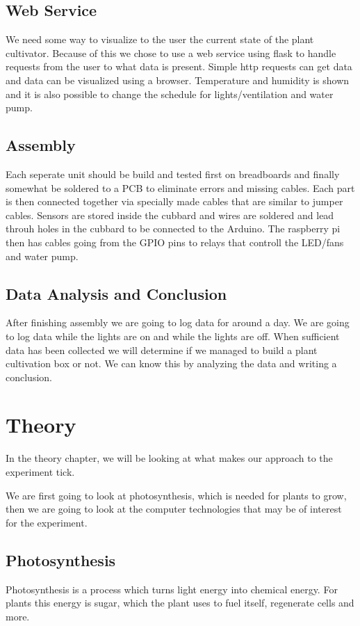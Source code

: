 \documentclass[a4paper,12pt,twoside,openright,titlepage]{book}
\begin{document}
\section{Web Service}

We need some way to visualize to the user the current state of the plant cultivator. Because of this we chose to use a web service using flask to handle requests from the user to what data is present. Simple http requests can get data and data can be visualized using a browser. Temperature and humidity is shown and it is also possible to change the schedule for lights/ventilation and water pump.

\section{Assembly}

Each seperate unit should be build and tested first on breadboards and finally somewhat be soldered to a PCB to eliminate errors and missing cables. Each part is then connected together via specially made cables that are similar to jumper cables. Sensors are stored inside the cubbard and wires are soldered and lead throuh holes in the cubbard to be connected to the Arduino. The raspberry pi then has cables going from the GPIO pins to relays that controll the LED/fans and water pump.

\section{Data Analysis and Conclusion}
After finishing assembly we are going to log data for around a day. We are going to log data while the lights are on and while the lights are off. When sufficient data has been collected we will determine if we managed to build a plant cultivation box or not. We can know this by analyzing the data and writing a conclusion.

\chapter{Theory}
In the theory chapter, we will be looking at what makes our approach to the experiment tick.

We are first going to look at photosynthesis, which is needed for plants to grow, then we are going to look at the computer technologies that may be of interest for the experiment.

\section{Photosynthesis}
Photosynthesis is a process which turns light energy into chemical energy. For plants this energy is sugar, which the plant uses to fuel itself, regenerate cells and more.
\end{document}
